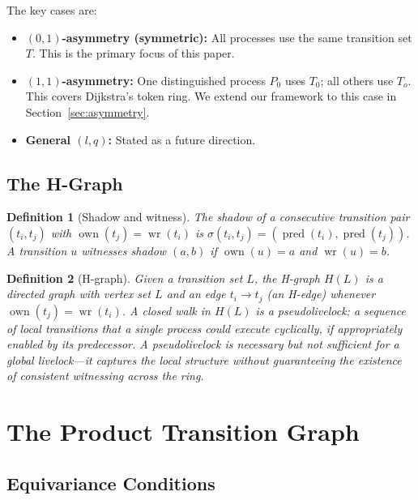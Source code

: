 \documentclass[11pt]{article}
\newtheorem{definition}{Definition}
\begin{document}
The key cases are:
\begin{itemize}[nosep]
\item \textbf{$(0,1)$-asymmetry (symmetric):} All processes use the same transition set $T$. This is the primary focus of this paper.
\item \textbf{$(1,1)$-asymmetry:} One distinguished process $P_0$ uses $T_0$; all others use $T_o$. This covers Dijkstra's token ring. We extend our framework to this case in Section~\ref{sec:asymmetry}.
\item \textbf{General $(l,q)$:} Stated as a future direction.
\end{itemize}

\subsection{The H-Graph}

\begin{definition}[Shadow and witness]
The \emph{shadow} of a consecutive transition pair $(t_i, t_j)$ with $\operatorname{own}(t_j) = \operatorname{wr}(t_i)$ is $\sigma(t_i, t_j) = (\operatorname{pred}(t_i), \operatorname{pred}(t_j))$. A transition $u$ \emph{witnesses} shadow $(a, b)$ if $\operatorname{own}(u) = a$ and $\operatorname{wr}(u) = b$.
\end{definition}

\begin{definition}[H-graph]
\label{def:hgraph}
Given a transition set $L$, the \emph{H-graph} $H(L)$ is a directed graph with vertex set $L$ and an edge $t_i \to t_j$ (an \emph{H-edge}) whenever $\operatorname{own}(t_j) = \operatorname{wr}(t_i)$. A closed walk in $H(L)$ is a \emph{pseudolivelock}: a sequence of local transitions that a single process could execute cyclically, if appropriately enabled by its predecessor. A pseudolivelock is necessary but not sufficient for a global livelock---it captures the local structure without guaranteeing the existence of consistent witnessing across the ring.
\end{definition}

\section{The Product Transition Graph}
\label{sec:product}

\subsection{Equivariance Conditions}
\end{document}
